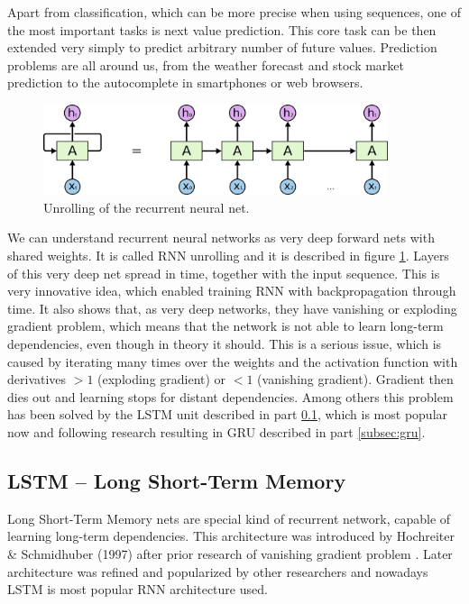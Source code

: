 Apart from classification, which can be more precise when using sequences, one of the most important tasks is next value prediction. This core task can be then extended very simply to predict arbitrary number of future values. Prediction problems are all around us, from the weather forecast and stock market prediction to the autocomplete in smartphones or web browsers.

\begin{figure}[!ht]
	\centering
	\includegraphics[width=0.9\textwidth]{fig/RNN-unrolled.png}
	\caption{Unrolling of the recurrent neural net. \cite{colah-lstm}
		\label{fig:rnn-unroll}}
\end{figure}

We can understand recurrent neural networks as very deep forward nets with shared weights. It is called RNN unrolling and it is described in figure \ref{fig:rnn-unroll}. Layers of this very deep net spread in time, together with the input sequence. This is very innovative idea, which enabled training RNN with backpropagation through time. It also shows that, as very deep networks, they have vanishing or exploding gradient problem, which means that the network is not able to learn long-term dependencies, even though in theory it should. This is a serious issue, which is caused by iterating many times over the weights and the activation function with derivatives $>1$ (exploding gradient) or $<1$ (vanishing gradient). Gradient then dies out and learning stops for distant dependencies. Among others this problem has been solved by the LSTM unit described in part \ref{subsec:lstm}, which is most popular now and following research resulting in GRU described in part \ref{subsec:gru}.

		\subsection{LSTM -- Long Short-Term Memory}\label{subsec:lstm}

Long Short-Term Memory nets are special kind of recurrent network, capable of learning long-term dependencies. This architecture was introduced by Hochreiter \& Schmidhuber (1997) \cite{Hochreiter:1997:LSM:1246443.1246450} after prior research of vanishing gradient problem \cite{hochreiter1991untersuchungen}. Later architecture was refined and popularized by other researchers \cite{DBLP:conf/ijcnn/GersS00}\cite{DBLP:journals/neco/GersSC00} and nowadays LSTM is most popular RNN architecture used.

